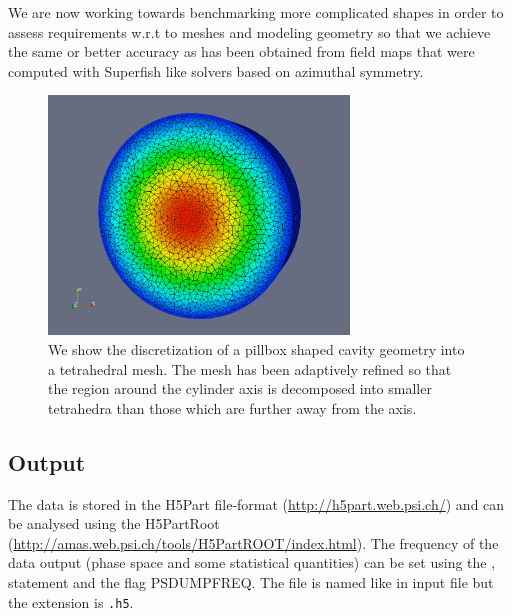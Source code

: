 We are now working towards benchmarking more complicated shapes in order to
assess requirements w.r.t to meshes and modeling geometry so that we
achieve the same or better accuracy as has been obtained from field
maps that were computed with Superfish like solvers based on azimuthal symmetry.

\begin{figure}
  \begin{center}
  \includegraphics[origin=bl,width=80mm,angle=0]{./figures/adaptivePillboxMesh.pdf}
  \caption[Tetrahedral mesh of a pillbox shaped cavity]{\label{figure_pillbox_adaptively_refined_mesh}
    We show the discretization of a pillbox shaped cavity geometry
        into a tetrahedral mesh. The mesh has been adaptively
        refined so that the region around the cylinder axis is
        decomposed into smaller tetrahedra than those which are
        further away from the axis.
  }
  \end{center}
%
\end{figure}

\clearpage
\subsection{Output}
The data is stored in the H5Part file-format (\url{http://h5part.web.psi.ch/}) and can be analysed
using the H5PartRoot (\url{http://amas.web.psi.ch/tools/H5PartROOT/index.html}). The frequency 
of the data output (phase space and some statistical quantities) can be set using the , 
statement and the flag PSDUMPFREQ. The file is named like in input file but the extension is {\tt .h5}. 

